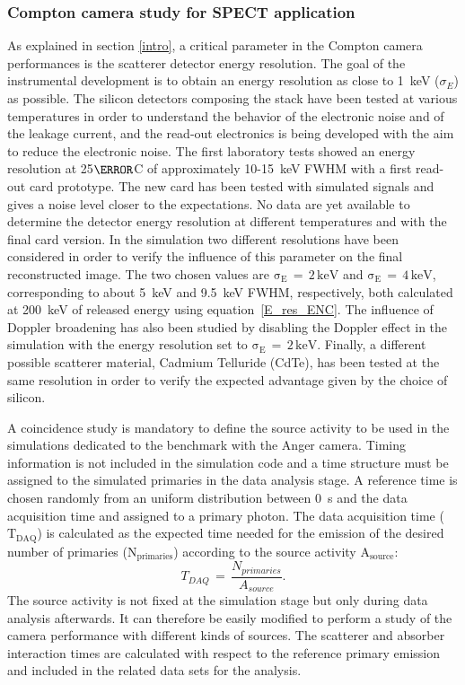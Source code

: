 \subsubsection{Compton camera study for SPECT application}\label{CC_SPECT}
As explained in section \ref{intro}, a critical parameter in the Compton camera performances is the scatterer detector energy resolution. The goal of the instrumental development is to obtain an energy resolution as close to 1~keV ($\sigma_{E}$) as possible. The silicon detectors composing the stack have been tested at various temperatures in order to understand the behavior of the electronic noise and of the leakage current, and the read-out electronics is being developed with the aim to reduce the electronic noise. The first laboratory tests showed an energy resolution at 25$\degree$C of approximately 10-15~keV FWHM with a first read-out card prototype. The new card has been tested with simulated signals and gives a noise level closer to the expectations. No data are yet available to determine the detector energy resolution at different temperatures and with the final card version. In the simulation two different resolutions have been considered in order to verify the influence of this parameter on the final reconstructed image. The two chosen values are $\mathrm{\sigma_{E}\,=\,2\,keV}$ and $\mathrm{\sigma_{E}\,=\,4\,keV}$, corresponding to about 5~keV and 9.5~keV FWHM, respectively, both calculated at 200~keV of released energy using equation~\ref{E_res_ENC}. The influence of Doppler broadening has also been studied by disabling the Doppler effect in the simulation with the energy resolution set to $\mathrm{\sigma_{E}\,=\,2\,keV}$. Finally, a different possible scatterer material, Cadmium Telluride (CdTe), has been tested at the same resolution in order to verify the expected advantage given by the choice of silicon.

A coincidence study is mandatory to define the source activity to be used in the simulations dedicated to the benchmark with the Anger camera. Timing information is not included in the simulation code and a time structure must be assigned to the simulated primaries in the data analysis stage. A reference time is chosen randomly from an uniform distribution between 0~s and the data acquisition time and assigned to a primary photon. The data acquisition time ($\mathrm{T_{DAQ}}$) is calculated as the expected time needed for the emission of the desired number of primaries ($\mathrm{N_{primaries}}$) according to the source activity $\mathrm{A_{source}}$:
\begin{equation}
T_{DAQ}\, = \,\frac{N_{primaries}}{A_{source}}.
\label{DAQ_time}
\end{equation} 
The source activity is not fixed at the simulation stage but only during data analysis afterwards. It can therefore be easily modified to perform a study of the camera performance with different kinds of sources. The scatterer and absorber interaction times are calculated with respect to the reference primary emission and included in the related data sets for the analysis.

